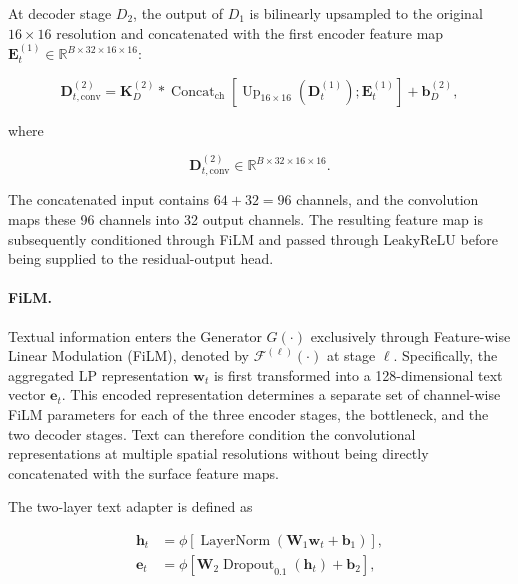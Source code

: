 At decoder stage $D_2$, the output of $D_1$ is bilinearly upsampled to the
original $16\times16$ resolution and concatenated with the first encoder
feature map
$\mathbf{E}^{(1)}_t\in\mathbb{R}^{B\times32\times16\times16}$:

\begin{equation}\label{eq:ch3:decoder2_convolution}
\mathbf{D}^{(2)}_{t,\mathrm{conv}}
=
\mathbf{K}^{(2)}_D
\ast
\operatorname{Concat}_{\mathrm{ch}}
\left[
\operatorname{Up}_{16\times16}
\left(
\mathbf{D}^{(1)}_t
\right);
\mathbf{E}^{(1)}_t
\right]
+
\mathbf{b}^{(2)}_D,
\end{equation}

where

\begin{equation}
\mathbf{D}^{(2)}_{t,\mathrm{conv}}
\in
\mathbb{R}^{B\times32\times16\times16}.
\end{equation}

The concatenated input contains $64+32=96$ channels, and the convolution maps
these 96 channels into 32 output channels. The resulting feature map is
subsequently conditioned through FiLM and passed through LeakyReLU before
being supplied to the residual-output head.



\paragraph*{FiLM.}
Textual information enters the Generator $G(\cdot)$ exclusively through
Feature-wise Linear Modulation (FiLM), denoted by
$\mathcal{F}^{(\ell)}(\cdot)$ at stage $\ell$. Specifically, the aggregated
LP representation $\mathbf{w}_t$ is first transformed into a
128-dimensional text vector $\mathbf{e}_t$. This encoded representation
determines a separate set of channel-wise FiLM parameters for each of the
three encoder stages, the bottleneck, and the two decoder stages. Text can
therefore condition the convolutional representations at multiple spatial
resolutions without being directly concatenated with the surface feature
maps.

The two-layer text adapter is defined as

\begin{equation}\label{eq:ch3:text_adapter}
\begin{aligned}
\mathbf{h}_t
&=
\phi\left[
\operatorname{LayerNorm}
\left(
\mathbf{W}_1\mathbf{w}_t+\mathbf{b}_1
\right)
\right],\\
\mathbf{e}_t
&=
\phi\left[
\mathbf{W}_2
\operatorname{Dropout}_{0.1}
\left(
\mathbf{h}_t
\right)
+
\mathbf{b}_2
\right],
\end{aligned}
\end{equation}

